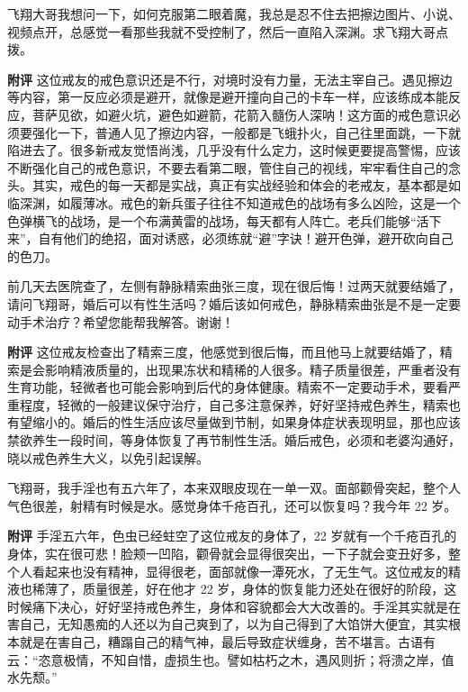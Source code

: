 \begin{case}
    飞翔大哥我想问一下，如何克服第二眼着魔，我总是忍不住去把擦边图片、小说、视频点开，总感觉一看那些我就不受控制了，然后一直陷入深渊。求飞翔大哥点拨。

    \textbf{附评} 这位戒友的戒色意识还是不行，对境时没有力量，无法主宰自己。遇见擦边等内容，第一反应必须是避开，就像是避开撞向自己的卡车一样，应该练成本能反应，菩萨见欲，如避火坑，避色如避箭，花箭入髓伤人深呐！这方面的戒色意识必须要强化一下，普通人见了擦边内容，一般都是飞蛾扑火，自己往里面跳，一下就陷进去了。很多新戒友觉悟尚浅，几乎没有什么定力，这时候更要提高警惕，应该不断强化自己的戒色意识，不要去看第二眼，管住自己的视线，牢牢看住自己的念头。其实，戒色的每一天都是实战，真正有实战经验和体会的老戒友，基本都是如临深渊，如履薄冰。戒色的新兵蛋子往往不知道戒色的战场有多么凶险，这是一个色弹横飞的战场，是一个布满黄雷的战场，每天都有人阵亡。老兵们能够“活下来”，自有他们的绝招，面对诱惑，必须练就“避”字诀！避开色弹，避开砍向自己的色刀。
\end{case}

\begin{case}
    前几天去医院查了，左侧有静脉精索曲张三度，现在很后悔！过两天就要结婚了，请问飞翔哥，婚后可以有性生活吗？婚后该如何戒色，静脉精索曲张是不是一定要动手术治疗？希望您能帮我解答。谢谢！

    \textbf{附评} 这位戒友检查出了精索三度，他感觉到很后悔，而且他马上就要结婚了，精索是会影响精液质量的，出现果冻状和精稀的人很多。精子质量很差，严重者没有生育功能，轻微者也可能会影响到后代的身体健康。精索不一定要动手术，要看严重程度，轻微的一般建议保守治疗，自己多注意保养，好好坚持戒色养生，精索也有望缩小的。婚后的性生活应该尽量做到节制，如果身体症状表现明显，那也应该禁欲养生一段时间，等身体恢复了再节制性生活。婚后戒色，必须和老婆沟通好，晓以戒色养生大义，以免引起误解。
\end{case}

\begin{case}
    飞翔哥，我手淫也有五六年了，本来双眼皮现在一单一双。面部颧骨突起，整个人气色很差，射精有时候是水。感觉身体千疮百孔，还可以恢复吗？我今年 22 岁。

    \textbf{附评} 手淫五六年，色虫已经蛀空了这位戒友的身体了，22 岁就有一个千疮百孔的身体，实在很可悲！脸颊一凹陷，颧骨就会显得很突出，一下子就会变丑好多，整个人看起来也没有精神，显得很老，面部就像一潭死水，了无生气。这位戒友的精液也稀薄了，质量很差，好在他才 22 岁，身体的恢复能力还处在很好的阶段，这时候痛下决心，好好坚持戒色养生，身体和容貌都会大大改善的。手淫其实就是在害自己，无知愚痴的人还以为自己爽到了，以为自己得到了大馅饼大便宜，其实根本就是在害自己，糟蹋自己的精气神，最后导致症状缠身，苦不堪言。古语有云：“恣意极情，不知自惜，虚损生也。譬如枯朽之木，遇风则折；将溃之岸，值水先颓。”
\end{case}

